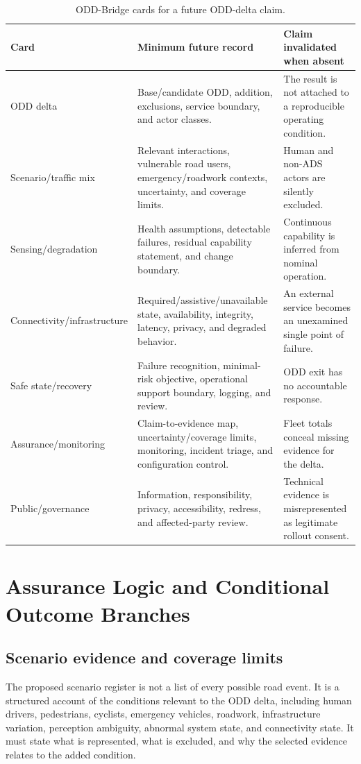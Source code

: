 \documentclass[conference]{../../../../Conference-LaTeX-template_10-17-19/IEEEtran}
\begin{document}
\begin{table}[!t]
\caption{ODD-Bridge cards for a future ODD-delta claim.}
\label{tab:cards}
\centering
\small
\begin{tabularx}{\textwidth}{lY Y}
\toprule
Card & Minimum future record & Claim invalidated when absent \\
\midrule
ODD delta & Base/candidate ODD, addition, exclusions, service boundary, and actor classes. & The result is not attached to a reproducible operating condition. \\
Scenario/traffic mix & Relevant interactions, vulnerable road users, emergency/roadwork contexts, uncertainty, and coverage limits. & Human and non-ADS actors are silently excluded. \\
Sensing/degradation & Health assumptions, detectable failures, residual capability statement, and change boundary. & Continuous capability is inferred from nominal operation. \\
Connectivity/infrastructure & Required/assistive/unavailable state, availability, integrity, latency, privacy, and degraded behavior. & An external service becomes an unexamined single point of failure. \\
Safe state/recovery & Failure recognition, minimal-risk objective, operational support boundary, logging, and review. & ODD exit has no accountable response. \\
Assurance/monitoring & Claim-to-evidence map, uncertainty/coverage limits, monitoring, incident triage, and configuration control. & Fleet totals conceal missing evidence for the delta. \\
Public/governance & Information, responsibility, privacy, accessibility, redress, and affected-party review. & Technical evidence is misrepresented as legitimate rollout consent. \\
\bottomrule
\end{tabularx}
\end{table}

\section{Assurance Logic and Conditional Outcome Branches}
\subsection{Scenario evidence and coverage limits}
The proposed scenario register is not a list of every possible road event. It is a structured account of the conditions relevant to the ODD delta, including human drivers, pedestrians, cyclists, emergency vehicles, roadwork, infrastructure variation, perception ambiguity, abnormal system state, and connectivity state. It must state what is represented, what is excluded, and why the selected evidence relates to the added condition.
\end{document}
